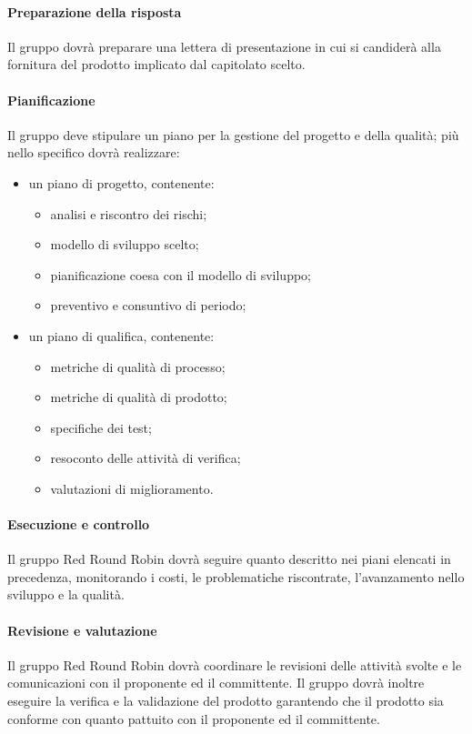 		\paragraph{Preparazione della risposta}
			Il gruppo dovrà preparare una lettera di presentazione in cui si candiderà alla fornitura del prodotto implicato dal capitolato scelto.
		\paragraph{Pianificazione}
			Il gruppo deve stipulare un piano per la gestione del progetto e della qualità; più nello specifico dovrà realizzare:
			\begin{itemize}
				\item un piano di progetto, contenente:
				\begin{itemize}
				 	\item analisi e riscontro dei rischi;
				 	\item modello di sviluppo scelto;
				 	\item pianificazione coesa con il modello di sviluppo;
				 	\item preventivo e consuntivo di periodo;
				 \end{itemize} 
				\item un piano di qualifica, contenente: 
				\begin{itemize}
					\item metriche di qualità di processo;
					\item metriche di qualità di prodotto;
					\item specifiche dei test;
					\item resoconto delle attività di verifica;
					\item valutazioni di miglioramento.
				\end{itemize}
			\end{itemize}
			
		\paragraph{Esecuzione e controllo}
			Il gruppo Red Round Robin dovrà seguire quanto descritto nei piani elencati in precedenza, monitorando i costi, le problematiche riscontrate, l'avanzamento nello sviluppo e la qualità.
		\paragraph{Revisione e valutazione}
			Il gruppo Red Round Robin dovrà coordinare le revisioni delle attività svolte e le comunicazioni con il proponente ed il committente. Il gruppo dovrà inoltre eseguire la verifica e la validazione del prodotto garantendo che il prodotto sia conforme con quanto pattuito con il proponente ed il committente.
